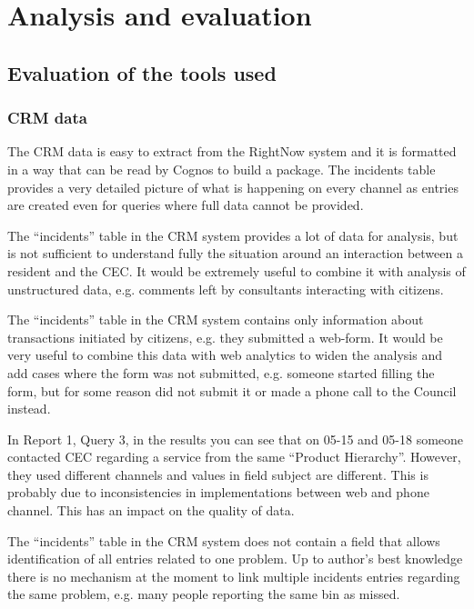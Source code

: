 
\chapter{Analysis and evaluation}

	\section{Evaluation of the tools used}

		\subsection{CRM data}
		
The CRM data is easy to extract from the RightNow system and it is formatted in a way that can be read by Cognos to build a package. The incidents table provides a very detailed picture of what is happening on every channel as entries are created even for queries where full data cannot be provided.

The “incidents” table in the CRM system provides a lot of data for analysis, but is not sufficient to understand fully the situation around an interaction between a resident and the CEC. It would be extremely useful to combine it with analysis of unstructured data, e.g. comments left by consultants interacting with citizens.

The “incidents” table in the CRM system contains only information about transactions initiated by citizens, e.g. they submitted a web-form. It would be very useful to combine this data with web analytics to widen the analysis and add cases where the form was not submitted, e.g. someone started filling the form, but for some reason did not submit it or made a phone call to the Council instead.

In Report 1, Query 3, in the results you can see that on 05-15 and 05-18 someone contacted CEC regarding a service from the same “Product Hierarchy”. However, they used different channels and values in field subject are different. This is probably due to inconsistencies in implementations between web and phone channel. This has an impact on the quality of data. 

The “incidents” table in the CRM system does not contain a field that allows identification of all entries related to one problem. Up to author’s best knowledge there is no mechanism at the moment to link multiple incidents entries regarding the same problem, e.g. many people reporting the same bin as missed. 

